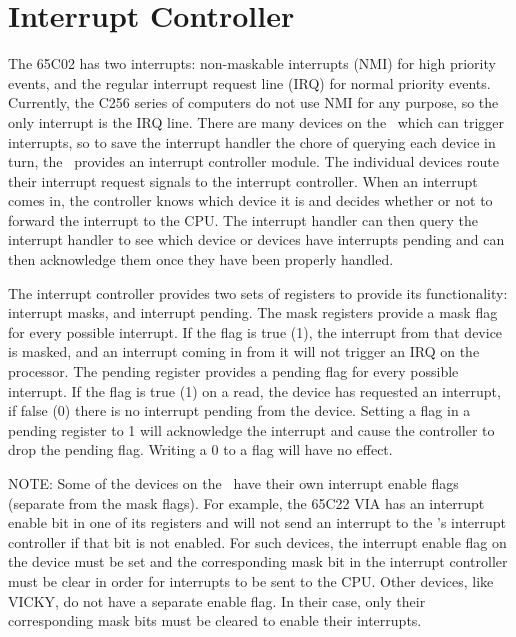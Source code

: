 \chapter{Interrupt Controller}

The 65C02 has two interrupts: non-maskable interrupts (NMI) for high priority events, and the regular interrupt request line (IRQ) for normal priority events. Currently, the C256 series of computers do not use NMI for any purpose, so the only interrupt is the IRQ line. There are many devices on the \jr\ which can trigger interrupts, so to save the interrupt handler the chore of querying each device in turn, the \jr\ provides an interrupt controller module.
The individual devices route their interrupt request signals to the interrupt controller. When an interrupt comes in, the controller knows which device it is and decides whether or not to forward the interrupt to the CPU. The interrupt handler can then query the interrupt handler to see which device or devices have interrupts pending and can then acknowledge them once they have been properly handled.

The interrupt controller provides two sets of registers to provide its functionality: interrupt masks, and interrupt pending. The mask registers provide a mask flag for every possible interrupt. If the flag is true (1), the interrupt from that device is masked, and an interrupt coming in from it will not trigger an IRQ on the processor. The pending register provides a pending flag for every possible interrupt. If the flag is true (1) on a read, the device has requested an interrupt, if false (0) there is no interrupt pending from the device. Setting a flag in a pending register to 1 will acknowledge the interrupt and cause the controller to drop the pending flag. Writing a 0 to a flag will have no effect.

NOTE: Some of the devices on the \jr\ have their own interrupt enable flags (separate from the mask flags). For example, the 65C22 VIA has an interrupt enable bit in one of its registers and will not send an interrupt to the \jr’s interrupt controller if that bit is not enabled. For such devices, the interrupt enable flag on the device must be set and the corresponding mask bit in the interrupt controller must be clear in order for interrupts to be sent to the CPU. Other devices, like VICKY, do not have a separate enable flag. In their case, only their corresponding mask bits must be cleared to enable their interrupts.

